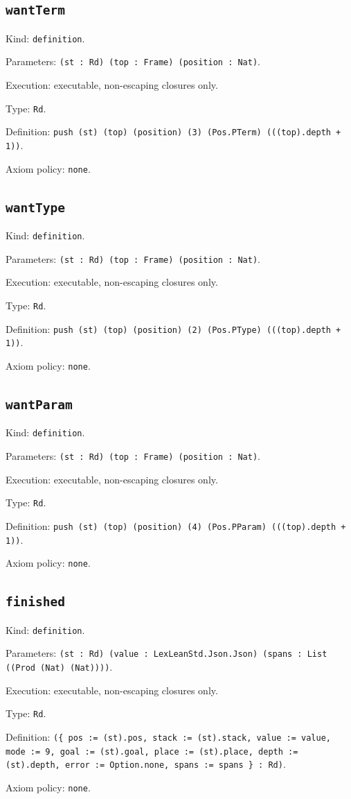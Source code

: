 \documentclass[11pt]{article}
\begin{document}
\subsection*{\texttt{wantTerm}}
\noindent Kind: \texttt{definition}.\par
\noindent Parameters: \texttt{(st : Rd) (top : Frame) (position : Nat)}.\par
\noindent Execution: executable, non-escaping closures only.\par
\noindent Type: \texttt{Rd}.\par
\noindent Definition: \texttt{push (st) (top) (position) (3) (Pos.PTerm) (((top).depth + 1))}.\par
\noindent Axiom policy: \texttt{none}.\par
\subsection*{\texttt{wantType}}
\noindent Kind: \texttt{definition}.\par
\noindent Parameters: \texttt{(st : Rd) (top : Frame) (position : Nat)}.\par
\noindent Execution: executable, non-escaping closures only.\par
\noindent Type: \texttt{Rd}.\par
\noindent Definition: \texttt{push (st) (top) (position) (2) (Pos.PType) (((top).depth + 1))}.\par
\noindent Axiom policy: \texttt{none}.\par
\subsection*{\texttt{wantParam}}
\noindent Kind: \texttt{definition}.\par
\noindent Parameters: \texttt{(st : Rd) (top : Frame) (position : Nat)}.\par
\noindent Execution: executable, non-escaping closures only.\par
\noindent Type: \texttt{Rd}.\par
\noindent Definition: \texttt{push (st) (top) (position) (4) (Pos.PParam) (((top).depth + 1))}.\par
\noindent Axiom policy: \texttt{none}.\par
\subsection*{\texttt{finished}}
\noindent Kind: \texttt{definition}.\par
\noindent Parameters: \texttt{(st : Rd) (value : LexLeanStd.Json.Json) (spans : List ((Prod (Nat) (Nat))))}.\par
\noindent Execution: executable, non-escaping closures only.\par
\noindent Type: \texttt{Rd}.\par
\noindent Definition: \texttt{(\{ pos := (st).pos, stack := (st).stack, value := value, mode := 9, goal := (st).goal, place := (st).place, depth := (st).depth, error := Option.none, spans := spans \} : Rd)}.\par
\noindent Axiom policy: \texttt{none}.\par
\end{document}
